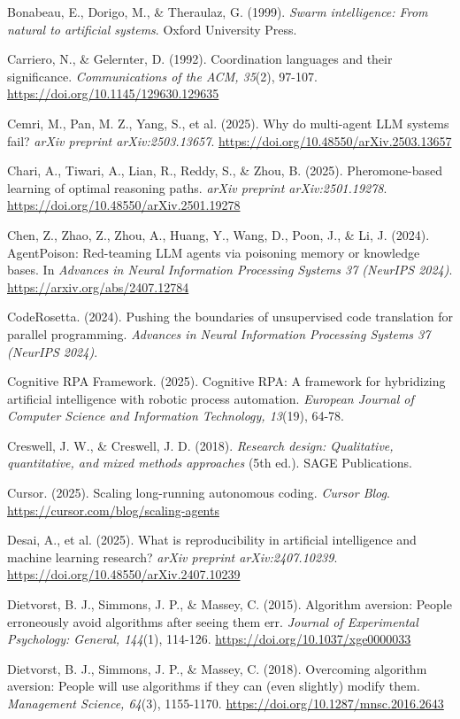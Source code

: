 Bonabeau, E., Dorigo, M., \& Theraulaz, G. (1999). \emph{Swarm
intelligence: From natural to artificial systems}. Oxford University
Press.

Carriero, N., \& Gelernter, D. (1992). Coordination languages and their
significance. \emph{Communications of the ACM, 35}(2), 97-107.
\url{https://doi.org/10.1145/129630.129635}

Cemri, M., Pan, M. Z., Yang, S., et al. (2025). Why do multi-agent LLM
systems fail? \emph{arXiv preprint arXiv:2503.13657}.
\url{https://doi.org/10.48550/arXiv.2503.13657}

Chari, A., Tiwari, A., Lian, R., Reddy, S., \& Zhou, B. (2025).
Pheromone-based learning of optimal reasoning paths. \emph{arXiv
preprint arXiv:2501.19278}.
\url{https://doi.org/10.48550/arXiv.2501.19278}

Chen, Z., Zhao, Z., Zhou, A., Huang, Y., Wang, D., Poon, J., \& Li, J.
(2024). AgentPoison: Red-teaming LLM agents via poisoning memory or
knowledge bases. In \emph{Advances in Neural Information Processing
Systems 37 (NeurIPS 2024)}. \url{https://arxiv.org/abs/2407.12784}

CodeRosetta. (2024). Pushing the boundaries of unsupervised code
translation for parallel programming. \emph{Advances in Neural
Information Processing Systems 37 (NeurIPS 2024)}.

Cognitive RPA Framework. (2025). Cognitive RPA: A framework for
hybridizing artificial intelligence with robotic process automation.
\emph{European Journal of Computer Science and Information Technology,
13}(19), 64-78.

Creswell, J. W., \& Creswell, J. D. (2018). \emph{Research design:
Qualitative, quantitative, and mixed methods approaches} (5th ed.). SAGE
Publications.

Cursor. (2025). Scaling long-running autonomous coding. \emph{Cursor
Blog}. \url{https://cursor.com/blog/scaling-agents}

Desai, A., et al. (2025). What is reproducibility in artificial
intelligence and machine learning research? \emph{arXiv preprint
arXiv:2407.10239}. \url{https://doi.org/10.48550/arXiv.2407.10239}

Dietvorst, B. J., Simmons, J. P., \& Massey, C. (2015). Algorithm
aversion: People erroneously avoid algorithms after seeing them err.
\emph{Journal of Experimental Psychology: General, 144}(1), 114-126.
\url{https://doi.org/10.1037/xge0000033}

Dietvorst, B. J., Simmons, J. P., \& Massey, C. (2018). Overcoming
algorithm aversion: People will use algorithms if they can (even
slightly) modify them. \emph{Management Science, 64}(3), 1155-1170.
\url{https://doi.org/10.1287/mnsc.2016.2643}

